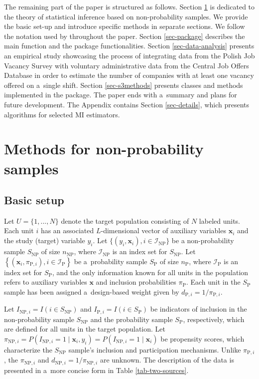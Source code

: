 \documentclass[nojss]{jss}
\begin{document}
The remaining part of the paper is structured as follows. Section
\ref{sec-methods} is dedicated to the theory of statistical inference
based on non-probability samples. We provide the basic set-up and
introduce specific methods in separate sections. We follow the notation
used by \citet{wu2022statistical} throughout the paper. Section
\ref{sec-package} describes the main function and the package
functionalities. Section \ref{sec-data-analysis} presents an empirical
study showcasing the process of integrating data from the Polish Job
Vacancy Survey with voluntary administrative data from the Central Job
Offers Database in order to estimate the number of companies with at
least one vacancy offered on a~single shift. Section \ref{sec-s3methods}
presents classes and  methods implemented in the package. The
paper ends with a~summary and plans for future development. The Appendix
contains Section \ref{sec-details}, which presents algorithms for
selected MI estimators.

\section{Methods for non-probability samples}\label{sec-methods}

\subsection{Basic setup}\label{basic-setup}

Let \(U=\{1,..., N\}\) denote the target population consisting of \(N\)
labeled units. Each unit \(i\) has an associated \(L\)-dimensional
vector of auxiliary variables \(\boldsymbol{x}_{i}\) and the study
(target) variable \(y_{i}\). Let
\(\{ (y_i, \boldsymbol{x}_i), i \in \mathcal{I}_{\text{NP}}\}\) be a
non-probability sample \(S_{\text{NP}}\) of size \(n_{\text{NP}}\),
where \(\mathcal{I}_{\text{NP}}\) is an index set for \(S_{\text{NP}}\).
Let
\(\left\{\left(\boldsymbol{x}_i, \pi_{\text{P},i}\right), i \in \mathcal{I}_{\text{P}}\right\}\)
be a~probability sample \(S_{\text{P}}\) of size \(n_{\text{P}}\), where
\(\mathcal{I}_{\text{P}}\) is an index set for \(S_{\text{P}}\), and the
only information known for all units in the population refers to
auxiliary variables \(\boldsymbol{x}\) and inclusion probabilities
\(\pi_{\text{P}}\). Each unit in the \(S_{\text{P}}\) sample has been
assigned a~design-based weight given by
\(d_{\text{P},i} = 1/\pi_{\text{P},i}\).

Let \(I_{\text{NP},i}=I(i \in S_{\text{NP}})\) and
\(I_{\text{P},i}=I(i \in S_{\text{P}})\) be indicators of inclusion in
the non-probability sample \(S_{\text{NP}}\) and the probability sample
\(S_{\text{P}}\), respectively, which are defined for all units in the
target population. Let
\(\pi_{\text{NP},i}=P(I_{\text{NP},i}=1 \mid \boldsymbol{x}_i, y_i)=P(I_{\text{NP},i}=1 \mid \boldsymbol{x}_i)\)
be propensity scores, which characterize the \(S_{\text{NP}}\) sample's
inclusion and participation mechanisms. Unlike \(\pi_{\text{P},i}\), the
\(\pi_{\text{NP},i}\) and \(d_{\text{NP},i}=1/\pi_{\text{NP},i}\) are
unknown. The description of the data is presented in a~more concise form
in Table \ref{tab-two-sources}.
\end{document}
